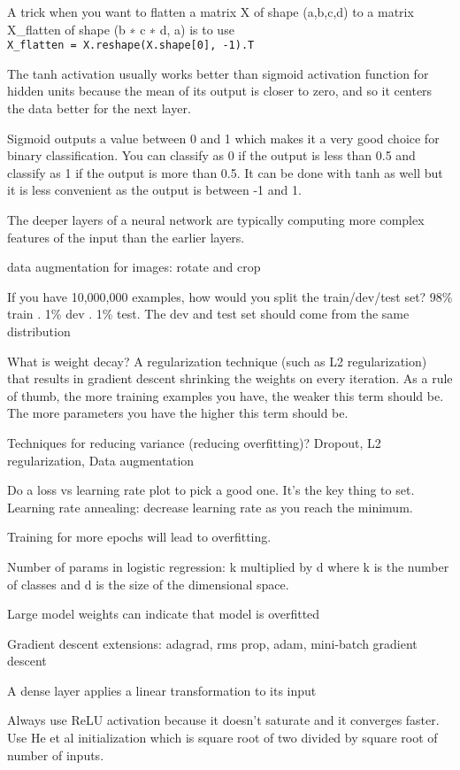 \documentclass[]{book}
\begin{document}
A trick when you want to flatten a matrix X of shape (a,b,c,d) to a
matrix X\_flatten of shape (b ∗ c ∗ d, a) is to use
\texttt{X\_flatten\ =\ X.reshape(X.shape{[}0{]},\ -1).T}

The tanh activation usually works better than sigmoid activation
function for hidden units because the mean of its output is closer to
zero, and so it centers the data better for the next layer.

Sigmoid outputs a value between 0 and 1 which makes it a very good
choice for binary classification. You can classify as 0 if the output is
less than 0.5 and classify as 1 if the output is more than 0.5. It can
be done with tanh as well but it is less convenient as the output is
between -1 and 1.

The deeper layers of a neural network are typically computing more
complex features of the input than the earlier layers.

data augmentation for images: rotate and crop

If you have 10,000,000 examples, how would you split the train/dev/test
set? 98\% train . 1\% dev . 1\% test. The dev and test set should come
from the same distribution

What is weight decay? A regularization technique (such as L2
regularization) that results in gradient descent shrinking the weights
on every iteration. As a rule of thumb, the more training examples you
have, the weaker this term should be. The more parameters you have the
higher this term should be.

Techniques for reducing variance (reducing overfitting)? Dropout, L2
regularization, Data augmentation

Do a loss vs learning rate plot to pick a good one. It's the key thing
to set. Learning rate annealing: decrease learning rate as you reach the
minimum.

Training for more epochs will lead to overfitting.

Number of params in logistic regression: k multiplied by d where k is
the number of classes and d is the size of the dimensional space.

Large model weights can indicate that model is overfitted

Gradient descent extensions: adagrad, rms prop, adam, mini-batch
gradient descent

A dense layer applies a linear transformation to its input

Always use ReLU activation because it doesn't saturate and it converges
faster. Use He et al initialization which is square root of two divided
by square root of number of inputs.
\end{document}
